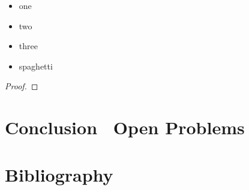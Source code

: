 \documentclass[a4paper,sfsidenotes,twoside,justified,nobib]{tufte-book-custom}
\begin{document}
\lipsum[1]
\begin{itemize}
	\item one
	\item two
	\item three
	\item spaghetti
\end{itemize}
\lipsum[1]

\begin{theorem}
	\lipsum[1]
\end{theorem}

\lipsum[1]

\begin{proof}
	\lipsum[1]
\end{proof}

\lipsum[1]

\lipsum[2]

\chapter{Conclusion \fancyand~Open Problems}

\backmatter
\chapter*{Bibliography}
\printbibliography[heading=none]
\end{document}
